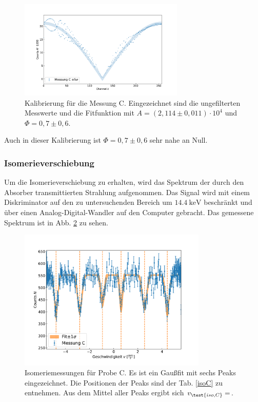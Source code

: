 \begin{figure}[ht]
	\centering
	\includegraphics[width=0.7\textwidth]{dat/velocityC.pdf}
	\caption{Kalibrierung für die Messung C. Eingezeichnet sind die ungefilterten Messwerte und die Fitfunktion mit $A = (2,114 \pm 0,011) \cdot 10^4$ und $\Phi=0,7 \pm 0,6$.}
	\label{fig:velocityC}
\end{figure}

Auch in dieser Kalibrierung ist $\Phi = 0,7 \pm 0,6$ sehr nahe an Null.

\subsubsection{Isomerieverschiebung}

Um die Isomerieverschiebung zu erhalten, wird das Spektrum der durch den Absorber transmittierten Strahlung aufgenommen.
Das Signal wird mit einem Diskriminator auf den zu untersuchenden Bereich um $\SI{14,4}{\kilo\electronvolt}$ beschränkt
	und über einen Analog-Digital-Wandler auf den Computer gebracht.
Das gemessene Spektrum ist in Abb. \ref{fig:IsomerieC} zu sehen.

\begin{figure}[ht]
	\centering	
	\includegraphics[width=0.8\textwidth]{dat/messungC.pdf}	
	\caption{Isomeriemessungen für Probe C.
		Es ist ein Gaußfit mit sechs Peaks eingezeichnet.
		Die Positionen der Peaks sind der Tab. \ref{isoC} zu entnehmen.
		Aus dem Mittel aller Peaks ergibt sich $v_\test{iso, C} = $.}
	\label{fig:IsomerieC}
\end{figure}


